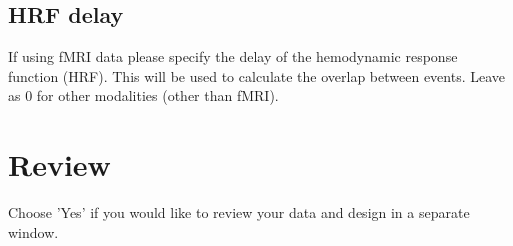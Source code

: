 \subsection{HRF delay}
If using fMRI data please specify the delay of the hemodynamic response function (HRF). This will be used to calculate the overlap between events. Leave as 0 for other modalities (other than fMRI).


\section{Review}
Choose 'Yes' if you would like to review your data and design in a separate window.

